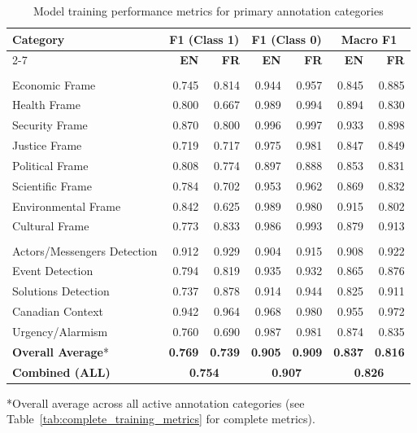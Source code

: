 \begin{table}[b!]
\centering
\caption{Model training performance metrics for primary annotation categories}
\label{tab:performance}
\small
\begin{tabular}{l|rr|rr|rr}
\toprule
\rowcolor{gray!10}
\textbf{Category} & \multicolumn{2}{c}{\textbf{F1 (Class 1)}} & \multicolumn{2}{c}{\textbf{F1 (Class 0)}} & \multicolumn{2}{c}{\textbf{Macro F1}} \\
\cline{2-7}
\rowcolor{gray!10}
& \textbf{EN} & \textbf{FR} & \textbf{EN} & \textbf{FR} & \textbf{EN} & \textbf{FR} \\
\midrule
\rowcolor{gray!10}
\multicolumn{7}{l}{\textit{Thematic Frames}} \\
\midrule
Economic Frame & 0.745 & 0.814 & 0.944 & 0.957 & 0.845 & 0.885 \\
Health Frame & 0.800 & 0.667 & 0.989 & 0.994 & 0.894 & 0.830 \\
Security Frame & 0.870 & 0.800 & 0.996 & 0.997 & 0.933 & 0.898 \\
Justice Frame & 0.719 & 0.717 & 0.975 & 0.981 & 0.847 & 0.849 \\
Political Frame & 0.808 & 0.774 & 0.897 & 0.888 & 0.853 & 0.831 \\
Scientific Frame & 0.784 & 0.702 & 0.953 & 0.962 & 0.869 & 0.832 \\
Environmental Frame & 0.842 & 0.625 & 0.989 & 0.980 & 0.915 & 0.802 \\
Cultural Frame & 0.773 & 0.833 & 0.986 & 0.993 & 0.879 & 0.913 \\
\midrule
\rowcolor{gray!10}
\multicolumn{7}{l}{\textit{Other Primary Categories: Actors, Events and Solutions}} \\
\midrule
Actors/Messengers Detection & 0.912 & 0.929 & 0.904 & 0.915 & 0.908 & 0.922 \\
Event Detection & 0.794 & 0.819 & 0.935 & 0.932 & 0.865 & 0.876 \\
Solutions Detection & 0.737 & 0.878 & 0.914 & 0.944 & 0.825 & 0.911 \\
Canadian Context & 0.942 & 0.964 & 0.968 & 0.980 & 0.955 & 0.972 \\
Urgency/Alarmism & 0.760 & 0.690 & 0.987 & 0.981 & 0.874 & 0.835 \\
\midrule
\rowcolor{gray!15}
\textbf{Overall Average}* & \textbf{0.769} & \textbf{0.739} & \textbf{0.905} & \textbf{0.909} & \textbf{0.837} & \textbf{0.816} \\
\rowcolor{gray!15}
\textbf{Combined (ALL)} & \multicolumn{2}{c}{\textbf{0.754}} & \multicolumn{2}{c}{\textbf{0.907}} & \multicolumn{2}{c}{\textbf{0.826}} \\
\bottomrule
\end{tabular}

\vspace{0.3em}
\noindent\footnotesize
*Overall average across all active annotation categories (see Table~\ref{tab:complete_training_metrics} for complete metrics).
\end{table}

